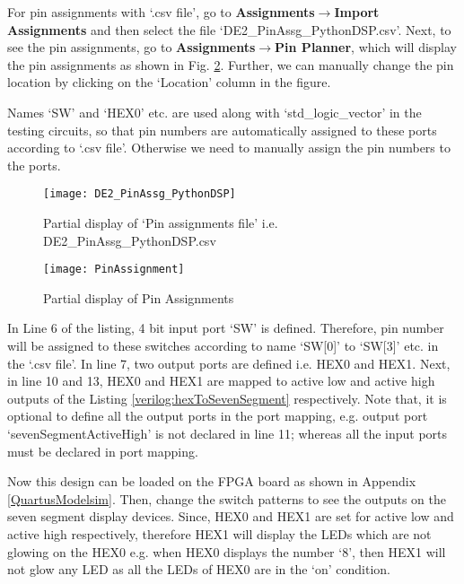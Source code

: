 For pin assignments with `.csv file', go to \textbf{Assignments$\rightarrow$Import Assignments} and then select the file `DE2\_PinAssg\_PythonDSP.csv'. Next, to see the pin assignments, go to \textbf{Assignments$\rightarrow$Pin Planner}, which will display the pin assignments as shown in Fig. \ref{fig:PinAssignment}. Further, we can manually change the pin location by clicking on the `Location' column in the figure. 

\begin{noNumBox}
	Names `SW' and `HEX0' etc. are used along with `std\_logic\_vector' in the testing circuits, so that pin numbers are automatically assigned to these ports according to `.csv file'. Otherwise we need to manually assign the pin numbers to the ports.
\end{noNumBox}

\begin{figure}[!h]
	\centering
	\texttt{[image: DE2\_PinAssg\_PythonDSP]}
	\caption{Partial display of `Pin assignments file' i.e. DE2\_PinAssg\_PythonDSP.csv}
	\label{fig:DE2_PinAssg_PythonDSP}
\end{figure}

\begin{figure}[!h]
	\centering
	\texttt{[image: PinAssignment]}
	\caption{Partial display of Pin Assignments}
	\label{fig:PinAssignment}
\end{figure}

\begin{explanation}
	In Line 6 of the listing, 4 bit input port `SW' is defined. Therefore, pin number will be assigned to these switches according to name `SW[0]' to `SW[3]' etc. in the `.csv file'. In line 7, two output ports are defined i.e. HEX0 and HEX1. Next, in line 10 and 13, HEX0 and HEX1 are mapped to active low and active high outputs of the Listing \ref{verilog:hexToSevenSegment} respectively. Note that, it is optional to define all the output ports in the port mapping, e.g. output port `sevenSegmentActiveHigh' is not declared in line 11; whereas all the input ports must be declared in port mapping. 
	
	Now this design can be loaded on the FPGA board as shown in Appendix \ref{QuartusModelsim}. Then, change the switch patterns to see the outputs on the seven segment display devices. Since, HEX0 and HEX1 are set for active low and active high respectively, therefore HEX1 will display the LEDs which are not glowing on the HEX0 e.g. when HEX0 displays the number `8', then HEX1 will not glow any LED as all the LEDs of HEX0 are in the `on' condition. 
\end{explanation}


